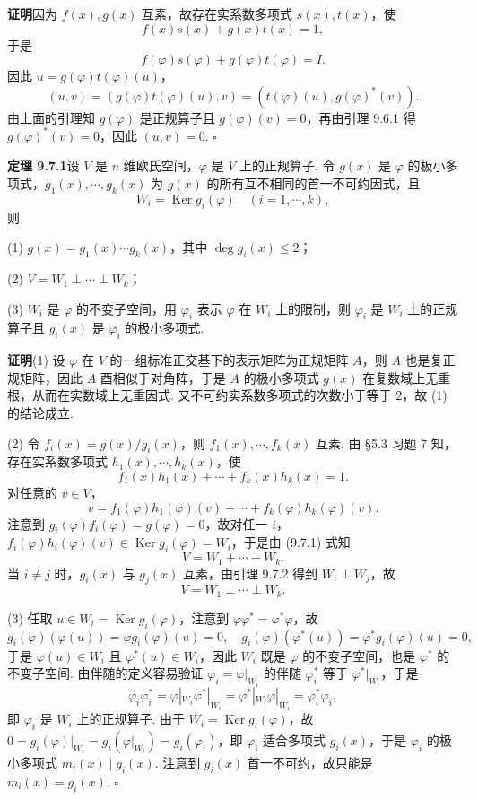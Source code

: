 \documentclass[UTF8,12pt,a4paper,fontset=fandol]{ctexart}
\begin{document}
\noindent\textbf{证明}\quad 因为 $f(x),g(x)$ 互素，故存在实系数多项式 $s(x),t(x)$，使
\[
  f(x)s(x)+g(x)t(x)=1,
\]
于是
\[
  f(\varphi)s(\varphi)+g(\varphi)t(\varphi)=I.
\]
因此 $u=g(\varphi)t(\varphi)(u)$，
\[
  (u,v)=(g(\varphi)t(\varphi)(u),v)=(t(\varphi)(u),g(\varphi)^*(v)).
\]
由上面的引理知 $g(\varphi)$ 是正规算子且 $g(\varphi)(v)=0$，再由引理 9.6.1 得 $g(\varphi)^*(v)=0$，因此 $(u,v)=0$. $\square$

\noindent\textbf{定理 9.7.1}\quad 设 $V$ 是 $n$ 维欧氏空间，$\varphi$ 是 $V$ 上的正规算子. 令 $g(x)$ 是 $\varphi$ 的极小多项式，$g_1(x),\cdots,g_k(x)$ 为 $g(x)$ 的所有互不相同的首一不可约因式，且
\[
  W_i=\operatorname{Ker} g_i(\varphi)\quad (i=1,\cdots,k),
\]
则

(1) $g(x)=g_1(x)\cdots g_k(x)$，其中 $\deg g_i(x)\le 2$；

(2) $V=W_1\perp\cdots\perp W_k$；

(3) $W_i$ 是 $\varphi$ 的不变子空间，用 $\varphi_i$ 表示 $\varphi$ 在 $W_i$ 上的限制，则 $\varphi_i$ 是 $W_i$ 上的正规算子且 $g_i(x)$ 是 $\varphi_i$ 的极小多项式.

\noindent\textbf{证明}\quad (1) 设 $\varphi$ 在 $V$ 的一组标准正交基下的表示矩阵为正规矩阵 $A$，则 $A$ 也是复正规矩阵，因此 $A$ 酉相似于对角阵，于是 $A$ 的极小多项式 $g(x)$ 在复数域上无重根，从而在实数域上无重因式. 又不可约实系数多项式的次数小于等于 $2$，故 (1) 的结论成立.

(2) 令 $f_i(x)=g(x)/g_i(x)$，则 $f_1(x),\cdots,f_k(x)$ 互素. 由 §5.3 习题 7 知，存在实系数多项式 $h_1(x),\cdots,h_k(x)$，使
\[
  f_1(x)h_1(x)+\cdots+f_k(x)h_k(x)=1.
\]
对任意的 $v\in V$，
\begin{equation}
  v=f_1(\varphi)h_1(\varphi)(v)+\cdots+f_k(\varphi)h_k(\varphi)(v).
  \tag{9.7.1}
\end{equation}
注意到 $g_i(\varphi)f_i(\varphi)=g(\varphi)=0$，故对任一 $i$，$f_i(\varphi)h_i(\varphi)(v)\in\operatorname{Ker} g_i(\varphi)=W_i$，于是由 (9.7.1) 式知
\[
  V=W_1+\cdots+W_k.
\]
当 $i\ne j$ 时，$g_i(x)$ 与 $g_j(x)$ 互素，由引理 9.7.2 得到 $W_i\perp W_j$，故
\[
  V=W_1\perp\cdots\perp W_k.
\]

(3) 任取 $u\in W_i=\operatorname{Ker}g_i(\varphi)$，注意到 $\varphi\varphi^*=\varphi^*\varphi$，故
\[
  g_i(\varphi)(\varphi(u))=\varphi g_i(\varphi)(u)=0,\quad
  g_i(\varphi)(\varphi^*(u))=\varphi^*g_i(\varphi)(u)=0,
\]
于是 $\varphi(u)\in W_i$ 且 $\varphi^*(u)\in W_i$，因此 $W_i$ 既是 $\varphi$ 的不变子空间，也是 $\varphi^*$ 的不变子空间. 由伴随的定义容易验证 $\varphi_i=\varphi|_{W_i}$ 的伴随 $\varphi_i^*$ 等于 $\varphi^*|_{W_i}$，于是
\[
  \varphi_i\varphi_i^*=\varphi|_{W_i}\varphi^*|_{W_i}
  =\varphi^*|_{W_i}\varphi|_{W_i}=\varphi_i^*\varphi_i,
\]
即 $\varphi_i$ 是 $W_i$ 上的正规算子. 由于 $W_i=\operatorname{Ker}g_i(\varphi)$，故 $0=g_i(\varphi)|_{W_i}=g_i(\varphi|_{W_i})=g_i(\varphi_i)$，即 $\varphi_i$ 适合多项式 $g_i(x)$，于是 $\varphi_i$ 的极小多项式 $m_i(x)\mid g_i(x)$. 注意到 $g_i(x)$ 首一不可约，故只能是 $m_i(x)=g_i(x)$. $\square$
\end{document}
